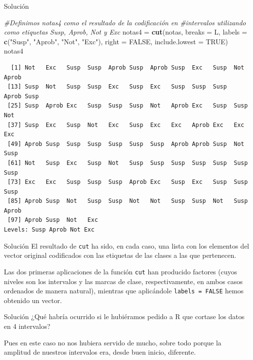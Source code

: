 \documentclass[
  ignorenonframetext,
  aspectratio=169]{beamer}
\newenvironment{Shaded}{\begin{snugshade}}{\end{snugshade}}
\newcommand{\AttributeTok}[1]{\textcolor[rgb]{0.13,0.29,0.53}{#1}}
\newcommand{\CommentTok}[1]{\textcolor[rgb]{0.56,0.35,0.01}{\textit{#1}}}
\newcommand{\ConstantTok}[1]{\textcolor[rgb]{0.56,0.35,0.01}{#1}}
\newcommand{\FunctionTok}[1]{\textcolor[rgb]{0.13,0.29,0.53}{\textbf{#1}}}
\newcommand{\NormalTok}[1]{#1}
\newcommand{\OtherTok}[1]{\textcolor[rgb]{0.56,0.35,0.01}{#1}}
\newcommand{\StringTok}[1]{\textcolor[rgb]{0.31,0.60,0.02}{#1}}
\begin{document}
\begin{frame}[fragile]{Solución}
\label{soluciuxf3n-20}
\begin{Shaded}
\begin{Highlighting}[]
\CommentTok{\#Definimos notas4 como el resultado de la codificación en }
\CommentTok{\#intervalos utilizando como etiquetas Susp, Aprob, Not y Exc}
\NormalTok{notas4 }\OtherTok{=} \FunctionTok{cut}\NormalTok{(notas, }\AttributeTok{breaks =}\NormalTok{ L, }\AttributeTok{labels =} \FunctionTok{c}\NormalTok{(}\StringTok{"Susp"}\NormalTok{, }\StringTok{"Aprob"}\NormalTok{, }\StringTok{"Not"}\NormalTok{, }\StringTok{"Exc"}\NormalTok{), }
             \AttributeTok{right =} \ConstantTok{FALSE}\NormalTok{, }\AttributeTok{include.lowest =} \ConstantTok{TRUE}\NormalTok{)}
\NormalTok{notas4}
\end{Highlighting}
\end{Shaded}

\begin{verbatim}
  [1] Not   Exc   Susp  Susp  Aprob Susp  Aprob Susp  Exc   Susp  Not   Aprob
 [13] Susp  Not   Susp  Susp  Exc   Susp  Exc   Susp  Susp  Susp  Aprob Susp 
 [25] Susp  Aprob Exc   Susp  Susp  Susp  Not   Aprob Exc   Susp  Susp  Not  
 [37] Susp  Exc   Susp  Not   Exc   Susp  Exc   Exc   Aprob Exc   Exc   Exc  
 [49] Aprob Susp  Susp  Susp  Susp  Susp  Susp  Aprob Aprob Susp  Not   Susp 
 [61] Not   Susp  Exc   Susp  Not   Susp  Susp  Susp  Susp  Susp  Susp  Susp 
 [73] Exc   Exc   Susp  Susp  Susp  Aprob Exc   Susp  Exc   Susp  Susp  Susp 
 [85] Aprob Susp  Not   Susp  Susp  Not   Not   Susp  Susp  Not   Susp  Aprob
 [97] Aprob Susp  Not   Exc  
Levels: Susp Aprob Not Exc
\end{verbatim}
\end{frame}

\begin{frame}[fragile]{Solución}
\label{soluciuxf3n-21}
El resultado de \texttt{cut} ha sido, en cada caso, una lista con los
elementos del vector original codificados con las etiquetas de las
clases a las que pertenecen.

Las dos primeras aplicaciones de la función \texttt{cut} han producido
factores (cuyos niveles son los intervalos y las marcas de clase,
respectivamente, en ambos casos ordenados de manera natural), mientras
que aplicándole \texttt{labels\ =\ FALSE} hemos obtenido un vector.
\end{frame}

\begin{frame}{Solución}
\label{soluciuxf3n-22}
¿Qué habría ocurrido si le hubiéramos pedido a R que cortase los datos
en 4 intervalos?

Pues en este caso no nos hubiera servido de mucho, sobre todo porque la
amplitud de nuestros intervalos era, desde buen inicio, diferente.
\end{frame}
\end{document}
